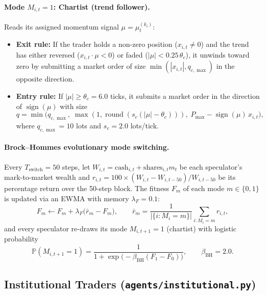 \documentclass[11pt,a4paper]{article}
\newcommand{\code}[1]{\texttt{#1}}
\newcommand{\sign}{\operatorname{sign}}
\begin{document}
\paragraph{Mode $M_{i,t} = 1$: Chartist (trend follower).} Reads its assigned momentum signal
$\mu = \mu^{(k_i)}_t$:
\begin{itemize}[nosep]
\item \textbf{Exit rule:} If the trader holds a non-zero position ($x_{i,t} \neq 0$) and the trend has
  either reversed ($x_{i,t}\cdot\mu < 0$) or faded ($|\mu| < 0.25\,\theta_c$), it unwinds toward zero by
  submitting a market order of size $\min(|x_{i,t}|, q_{c,\max})$ in the opposite direction.
\item \textbf{Entry rule:} If $|\mu| \ge \theta_c = 6.0$ ticks, it submits a market order in the
  direction of $\sign(\mu)$ with size
  \begin{equation}
    q = \min\!\big(q_{c,\max},\; \max(1, \operatorname{round}(s_c(|\mu| - \theta_c))),\;
    P_{\max} - \sign(\mu)\,x_{i,t}\big),
  \end{equation}
  where $q_{c,\max} = 10$ lots and $s_c = 2.0$ lots/tick.
\end{itemize}

\paragraph{Brock--Hommes evolutionary mode switching.} Every $T_{\text{switch}} = 50$ steps, let
$W_{i,t} = \text{cash}_{i,t} + \text{shares}_{i,t} m_t$ be each speculator's mark-to-market wealth and
$r_{i,t} = 100 \times (W_{i,t} - W_{i,t-50}) / W_{i,t-50}$ be its percentage return over the 50-step
block. The fitness $F_m$ of each mode $m \in \{0,1\}$ is updated via an EWMA with memory
$\lambda_F = 0.1$:
\begin{equation}
  F_m \leftarrow F_m + \lambda_F \big(\bar r_m - F_m\big), \qquad
  \bar r_m = \frac{1}{|\{i : M_{i} = m\}|} \sum_{i : M_i = m} r_{i,t},
\end{equation}
and every speculator re-draws its mode $M_{i,t+1} = 1$ (chartist) with logistic probability
\begin{equation}
  \mathbb{P}(M_{i,t+1} = 1) = \frac{1}{1 + \exp\!\big(-\beta_{\text{BH}}(F_1 - F_0)\big)},
  \qquad \beta_{\text{BH}} = 2.0.
\end{equation}

\subsection[Institutional Traders and Metaorders]{Institutional Traders (\code{agents/institutional.py})}
\label{sec:institutions}
\end{document}
